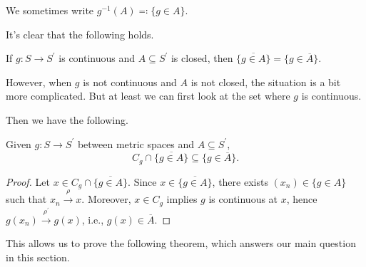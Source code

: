 \begin{notation}
	We sometimes write \(g ^{-1} (A) \eqqcolon \{ g \in A \} \).
\end{notation}

It's clear that the following holds.

\begin{note}
	If \(g \colon S \to S^{\prime} \) is continuous and \(A \subseteq S^{\prime} \) is closed, then \(\overline{\{ g \in A \} } = \{ g \in \overline{A} \}\).
\end{note}

However, when \(g\) is not continuous and \(A\) is not closed, the situation is a bit more complicated. But at least we can first look at the set where \(g\) is continuous.


Then we have the following.

\begin{proposition}\label{prop:pre-image-closure}
	Given \(g\colon S \to S^{\prime} \) between metric spaces and \(A \subseteq S^{\prime} \),
	\[
		C_g \cap \overline{\{ g\in A \} }
		\subseteq \{ g \in \overline{A}  \}.
	\]
\end{proposition}
\begin{proof}
	Let \(x \in C_g \cap \overline{\{ g\in A \} }\). Since \(x\in \overline{\{ g\in A \} }\), there exists \((x_n) \in \{ g\in A \} \) such that \(x_n \overset{\rho }{\to } x\). Moreover, \(x\in C_g\) implies \(g\) is continuous at \(x\), hence \(g(x_n) \overset{\rho ^{\prime} }{\to } g(x)\), i.e., \(g(x) \in \overline{A} \).
\end{proof}

This allows us to prove the following theorem, which answers our main question in this section.

